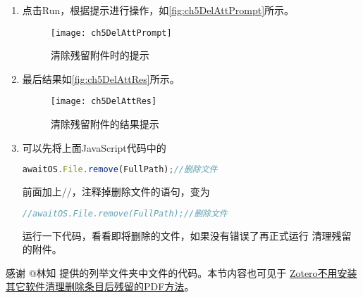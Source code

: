 \documentclass[cn,11pt,chinese]{elegantbook}
\begin{document}
\begin{enumerate}
\begin{lstlisting}[language=JavaScript]
									//判断是否在库的文件中
									for (let DirFile of DirFiles){
										if (AllFiles.indexOf(DirFile)==-1){
										DelFileNum += 1;//计数器加1
										FullPath = OS.Path.join(path, DirFile);
										OutText += DelFileNum + ": "+ DirFile + "\n" 
										await OS.File.remove(FullPath); //删除文件
										}
									}
									alert(DelFileNum + "个文件被清理。\n 被清理的文件：\n" + OutText);
									async function getFilePath(item) { //1 函数
									if (item && !item.isNote()) { //2 if
											if (item.isRegularItem()) { // Regular Item 一般条目//3 if 
											let attachmentIDs = item.getAttachments();
												for (let id of attachmentIDs) { //4 for
													var file = await Zotero.Items.get(id).getFilePathAsync();
													return file;
												} //4 for
											} // 3 if
											if (item.isAttachment()) { //附件条目 5 if
													var file = await item.getFilePathAsync();
													return file;
											}//5if
									} //2 if
									} 
									}
								\end{lstlisting}
				\item 点击Run，根据提示进行操作，如\autoref{fig:ch5DelAttPrompt}所示。
					\begin{figure}[ht]
						\centering
						\texttt{[image: ch5DelAttPrompt]}
						\caption{清除残留附件时的提示}
						\label{fig:ch5DelAttPrompt}
					\end{figure}
				\item 最后结果如\autoref{fig:ch5DelAttRes}所示。
					\begin{figure}[ht]
						\centering
						\texttt{[image: ch5DelAttRes]}
						\caption{清除残留附件的结果提示}
						\label{fig:ch5DelAttRes}
					\end{figure}
				\item 可以先将上面JavaScript代码中的
				\begin{lstlisting}[language=JavaScript]
					awaitOS.File.remove(FullPath);//删除文件
				\end{lstlisting}
				前面加上//，注释掉删除文件的语句，变为
				\begin{lstlisting}[language=JavaScript]
					//awaitOS.File.remove(FullPath);//删除文件
				\end{lstlisting}
				运行一下代码，看看即将删除的文件，如果没有错误了再正式运行
				清理残留的附件。
			\end{enumerate}
			感谢 @林知 提供的列举文件夹中文件的代码。本节内容也可见于
			\href{https://zhuanlan.zhihu.com/p/356071795}{Zotero不用安装其它软件清理删除条目后残留的PDF方法}。
			
\end{document}
